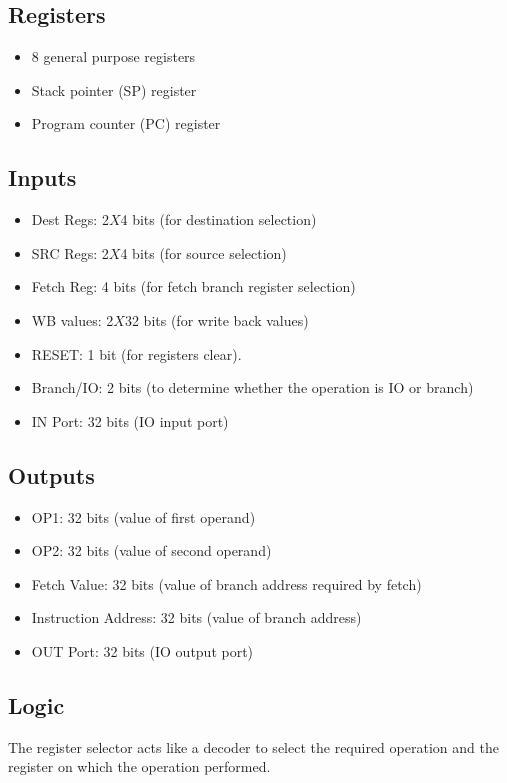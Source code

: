 \documentclass[12pt]{report}
\begin{document}
\subsection{Registers}
\begin{itemize}
    \item 8 general purpose registers
    \item Stack pointer (SP) register
    \item Program counter (PC) register
\end{itemize}

\subsection{Inputs}
\begin{itemize}
    \item Dest Regs: 2$X$4 bits (for destination selection)
    \item SRC Regs: 2$X$4 bits (for source selection)
    \item Fetch Reg: 4 bits (for fetch branch register selection)
    \item WB values: 2$X$32 bits (for write back values)
    \item RESET: 1 bit (for registers clear).
    \item Branch/IO: 2 bits (to determine whether the operation is IO or branch)
    \item IN Port: 32 bits (IO input port)
\end{itemize}

\subsection{Outputs}
\begin{itemize}
    \item OP1: 32 bits (value of first operand)
    \item OP2: 32 bits (value of second operand)
    \item Fetch Value: 32 bits (value of branch address required by fetch)
    \item Instruction Address: 32 bits (value of branch address)
    \item OUT Port: 32 bits (IO output port)
\end{itemize}

\subsection{Logic}
The register selector acts like a decoder to select the required operation and the register on which the operation performed.
\end{document}
